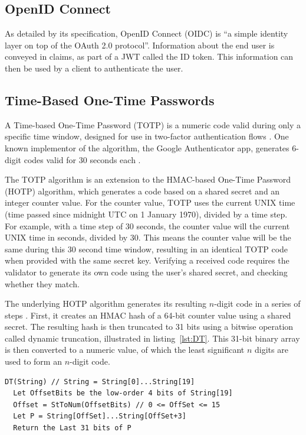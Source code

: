 \subsection{OpenID Connect}
As detailed by its specification, OpenID Connect (OIDC) is ``a simple identity layer on top of the OAuth 2.0 protocol''. Information about the end user is conveyed in claims, as part of a JWT called the ID token. This information can then be used by a client to authenticate the user. \autocite{Sakimura2014} 

\subsection{Time-Based One-Time Passwords}
A Time-based One-Time Password (TOTP) is a numeric code valid during only a specific time window, designed for use in two-factor authentication flows \autocite{MRaihi2011}. One known implementor of the algorithm, the Google Authenticator app, generates 6-digit codes valid for 30 seconds each \autocite{GoogleKeyUri}.

The TOTP algorithm is an extension to the HMAC-based One-Time Password (HOTP) algorithm, which generates a code based on a shared secret and an integer counter value. For the counter value, TOTP uses the current UNIX time (time passed since midnight UTC on 1 January 1970), divided by a time step. For example, with a time step of 30 seconds, the counter value will the current UNIX time in seconds, divided by 30. This means the counter value will be the same during this 30 second time window, resulting in an identical TOTP code when provided with the same secret key. Verifying a received code requires the validator to generate its own code using the user’s shared secret, and checking whether they match.

The underlying HOTP algorithm generates its resulting \(n\)-digit code in a series of steps \autocite{MRaihi2005}. First, it creates an HMAC hash of a 64-bit counter value using a shared secret. The resulting hash is then truncated to 31 bits using a bitwise operation called dynamic truncation, illustrated in listing~\ref{lst:DT}. This 31-bit binary array is then converted to a numeric value, of which the least significant \(n\) digits are used to form an \(n\)-digit code.

\begin{listing}[h]
\begin{verbatim}
DT(String) // String = String[0]...String[19]
  Let OffsetBits be the low-order 4 bits of String[19]
  Offset = StToNum(OffsetBits) // 0 <= OffSet <= 15
  Let P = String[OffSet]...String[OffSet+3]
  Return the Last 31 bits of P
\end{verbatim}
    \caption[Dynamic Truncation algorithm]{Dynamic Truncation algorithm \autocite{MRaihi2005}\label{lst:DT}}
\end{listing}

